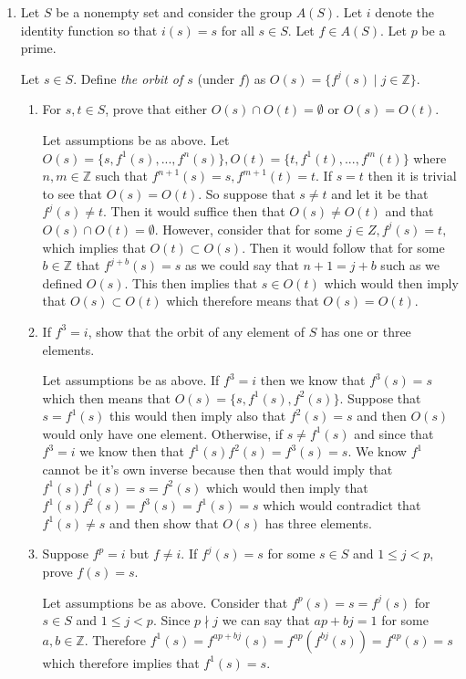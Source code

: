 \documentclass[11pt]{article}
\newcommand{\Z}{\mathbb{Z}}
\begin{document}
\begin{enumerate}
\begin{enumerate}
\end{enumerate}
\pagebreak

\item Let $S$ be a nonempty set and consider the group $A(S)$.
Let $i$ denote the identity function so that $i(s) = s$ for all $s \in S$.
Let $f \in A(S)$.  Let $p$ be a prime.

Let $s \in S$. Define \emph{the orbit of $s$} (under $f$) as
$O(s) = \{ f^j(s) \mid j \in \Z\}$.
\begin{enumerate}
\item 
For $s, t \in S$, prove that either $O(s) \cap O(t) = \emptyset$
or $O(s) = O(t)$.

Let assumptions be as above. Let $O(s) = \{s, f^1(s), ..., f^n(s)\}, O(t) = \{t, f^1(t), ..., f^m(t)\}$ where $n, m\in \Z$ such that $f^{n+1}(s) = s, f^{m+1}(t) = t$. If $s = t$ then it is trivial to see that $O(s) = O(t)$. So suppose that $s \neq t$ and let it be that $f^j(s) \neq t$. Then it would suffice then that $O(s)\neq O(t)$ and that $O(s)\cap O(t) = \emptyset$. However, consider that for some $j\in Z, f^j(s) = t,$ which implies that $O(t) \subset O(s)$. Then it would follow that for some $b\in \Z$ that $f^{j+b}(s) = s$ as we could say that $n+1 = j + b$ such as we defined $O(s)$. This then implies that $s\in O(t)$ which would then imply that $O(s)\subset O(t)$ which therefore means that $O(s) = O(t).$

\item If $f^3 = i$, show that the orbit of any element of $S$ has one
or three elements.

Let assumptions be as above. If $f^3=i$ then we know that $f^3(s) = s$ which then means that $O(s) = \{s, f^1(s), f^2(s)\}$. Suppose that $s = f^1(s)$ this would then imply also that $f^2(s) = s$ and then $O(s)$ would only have one element. Otherwise, if $s \neq f^1(s)$ and since that $f^3 = i$ we know then that $f^1(s)f^2(s) = f^3(s) = s$. We know $f^1$ cannot be it's own inverse because then that would imply that $f^1(s)f^1(s) = s = f^2(s)$ which would then imply that $f^1(s)f^2(s) = f^3(s) = f^1(s) = s$ which would contradict that $f^1(s) \neq s$ and then show that $O(s)$ has three elements. 

\item Suppose $f^p = i$ but $f \neq i$.  
If $f^j (s) = s$ for some $s \in S$ and $1 \leq j < p$,
prove $f(s) = s$.

Let assumptions be as above. Consider that $f^p(s) = s = f^j(s)$ for $s\in S$ and $1\leq j< p$. Since $p\nmid j$ we can say that $ap + bj = 1$ for some $a, b\in \Z$. Therefore $f^1(s) = f^{ap+bj}(s) = f^{ap}(f^{bj}(s)) = f^{ap}(s) = s$ which therefore implies that $f^1(s) = s.$


\end{enumerate}
\end{enumerate}
\end{document}
